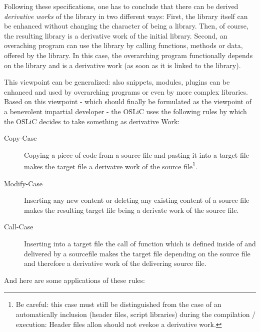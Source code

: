 Following these specifications, one has to conclude that there can be derived
\emph{derivative works} of the library in two different ways: First, the library
itself can be enhanced without changing the character of being a library. Then,
of course, the resulting library is a derivative work of the initial library.
Second, an overaching program can use the library by calling functions, methods
or data, offered by the library. In this case, the overarching program
functionally depends on the library and is a derivative work (as soon as it is
linked to the library).

This viewpoint can be generalized: also snippets, modules, plugins can be
enhanced and used by overarching programs or even by more complex libraries.
Based on this viewpoint - which should finally be formulated as the viewpoint of
a benevolent impartial developer - the OSLiC uses the following rules by which
the OSLiC decides to take something as derivative Work:
\label{sec:BenevolentDerivativeWorkUnderstanding}

\begin{description}
  \item[Copy-Case] Copying a piece of code from a source file and pasting it
  into a target file makes the target file a derivatve work of the source
  file\footnote{ Be careful: this case must still be distinguished from the case
  of an automatically inclusion (header files, script libraries) during the
  compilation / execution: Header files allon should not evekoe a derivative
  work.}.
  \item[Modify-Case] Inserting any new content or deleting any existing content
  of a source file makes the resulting target file being a derivate work of the
  source file.
  \item[Call-Case] Inserting into a target file the call of function which is
  defined inside of and delivered by a sourcefile makes the target file
  depending on the source file and therefore a derivative work of the delivering
  source file.
\end{description}

And here are some applications of these rules:

